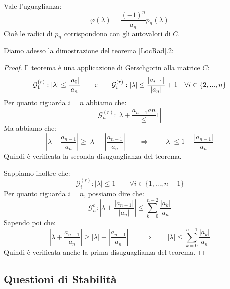 \documentclass[11pt,a4paper,twoside]{article}
\theoremstyle{definition}
\begin{document}
\begin{prop}{}{}
	Vale l'uguaglianza:
	\[ \varphi(\lambda) = \frac{(-1)^n}{a_n}p_n(\lambda)\]
	Cioè le radici di $p_n$ corrispondono con gli autovalori di $C$.
\end{prop}

Diamo adesso la dimostrazione del teorema \ref{LocRad}.2:

\begin{proof}
	Il teorema è una applicazione di Gerschgorin alla matrice $C$:
	\[ \mathcal G_1^{(r)}: |\lambda|\leq\frac{|a_0|}{a_n} \qquad \text e \qquad \mathcal G_i^{(r)}: |\lambda|\leq \frac{|a_{i-1}|}{|a_n|}+1 \quad \forall i \in \{2,...,n\}\]
	Per quanto riguarda $i = n$ abbiamo che:
	\[ \mathcal G_n^{(r)}: \left| \lambda + \frac{a_{n-1}{an}} \leq 1 \right| \]
	Ma abbiamo che:
	\[ \left|\lambda + \frac {a_{n-1}}{a_n}\right| \geq |\lambda| - \left|\frac{a_{n-1}}{a_n}\right| \qquad \Rightarrow \qquad |\lambda| \leq 1 + \frac{|a_{n-1}|}{|a_n|} \]
	Quindi è verificata la seconda disuguaglianza del teorema.

	Sappiamo inoltre che:
	\[ \mathcal G_i^{(r)}:|\lambda| \leq 1 \qquad \forall i \in\{1,...,n-1\} \]
	Per quanto riguarda $i = n$, possiamo dire che:
	\[ \mathcal G_n^{c}: \left|\lambda + \frac{|a_{n-1}|}{|a_n|} \right| \leq \sum_{k = 0}^{n-2} \frac{|a_k|}{|a_n|} \]
	Sapendo poi che:
	\[ \left|\lambda + \frac{a_{n-1}}{a_n}\right| \geq |\lambda| - \left|\frac{a_{n-1}}{a_n}\right|\qquad \Rightarrow \qquad |\lambda| \leq \sum_{k = 0}^{n-1}\frac{|a_k|}{a_n} \]
	Quindi è verificata anche la prima disuguaglianza del teorema.
\end{proof}

\subsection{Questioni di Stabilità}
\end{document}
